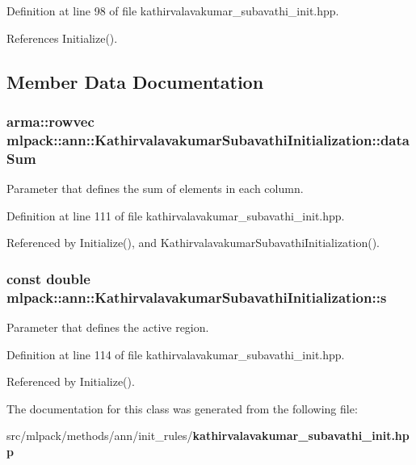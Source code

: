 Definition at line 98 of file kathirvalavakumar\+\_\+subavathi\+\_\+init.\+hpp.



References Initialize().



\subsection{Member Data Documentation}
\subsubsection[{data\+Sum}]{\setlength{\rightskip}{0pt plus 5cm}arma\+::rowvec mlpack\+::ann\+::\+Kathirvalavakumar\+Subavathi\+Initialization\+::data\+Sum\hspace{0.3cm}{\ttfamily [private]}}\label{classmlpack_1_1ann_1_1KathirvalavakumarSubavathiInitialization_a8db612528d3cf167b9115acab3c73ef7}


Parameter that defines the sum of elements in each column. 



Definition at line 111 of file kathirvalavakumar\+\_\+subavathi\+\_\+init.\+hpp.



Referenced by Initialize(), and Kathirvalavakumar\+Subavathi\+Initialization().

\subsubsection[{s}]{\setlength{\rightskip}{0pt plus 5cm}const double mlpack\+::ann\+::\+Kathirvalavakumar\+Subavathi\+Initialization\+::s\hspace{0.3cm}{\ttfamily [private]}}\label{classmlpack_1_1ann_1_1KathirvalavakumarSubavathiInitialization_a0726e59cc9cea1070da58be4821bc51f}


Parameter that defines the active region. 



Definition at line 114 of file kathirvalavakumar\+\_\+subavathi\+\_\+init.\+hpp.



Referenced by Initialize().



The documentation for this class was generated from the following file\+:\begin{DoxyCompactItemize}
\item 
src/mlpack/methods/ann/init\+\_\+rules/{\bf kathirvalavakumar\+\_\+subavathi\+\_\+init.\+hpp}\end{DoxyCompactItemize}

